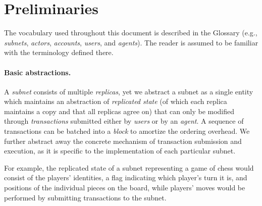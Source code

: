 \section{Preliminaries}
\label{sec:preliminaries}

The vocabulary used throughout this document is described in the Glossary \cite{glossary} (e.g., \emph{subnets}, \emph{actors}, \emph{accounts}, \emph{users}, and \emph{\ipc agents}).
The reader is assumed to be familiar with the terminology defined there.

\paragraph{Basic abstractions.}
A \emph{subnet} consists of multiple \emph{replicas}, yet we abstract a subnet as a single entity which maintains an  abstraction of \emph{replicated state} (of which each replica maintains a copy and that all replicas agree on)
that can only be modified through \emph{transactions} \gls{submit}ted either by \emph{\glspl{user}} or by an \emph{\gls{agent}}.
A sequence of transactions can be batched into a \emph{\gls{block}} to amortize the ordering overhead.
We further abstract away the concrete mechanism of transaction submission and execution, as it is specific to the implementation of each particular subnet.

For example, the replicated state of a subnet representing a game of chess would consist of the players' identities, a flag indicating which player's turn it is, and positions of the individual pieces on the board,
while players' moves would be performed by submitting transactions to the subnet.

